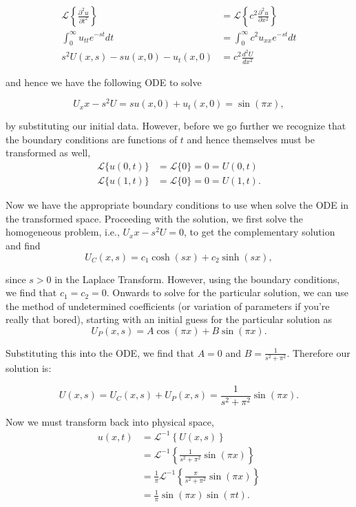 \begin{align*}
\mathscr{L}\left\{ \frac{\partial^2 u}{\partial t^2} \right\} &= \mathscr{L}\left\{ c^2 \frac{\partial^2 u}{\partial x^2} \right\} \\
\int_{0}^\infty u_{tt} e^{-st} dt &= \int_{0}^\infty c^2 u_{xx} e^{-st} dt \\
s^2 U(x,s) - s u(x,0) - u_t(x,0) &= c^2 \frac{ d^2 U}{dx^2} 
\end{align*}

and hence we have the following ODE to solve

$$U_xx - s^2 U = s u(x,0) + u_t(x,0) = \sin(\pi x),$$

by substituting our initial data. However, before we go further we recognize that the boundary conditions are functions of $t$ and hence themselves must be transformed as well,
\begin{align*}
\mathscr{L}\{ u(0,t)  \} &=  \mathscr{L}\{ 0 \} = 0 = U(0,t) \\
\mathscr{L}\{ u(1,t)  \} &=  \mathscr{L}\{ 0 \} = 0 = U(1,t).
\end{align*}

Now we have the appropriate boundary conditions to use when solve the ODE in the transformed space. Proceeding with the solution, we first solve the homogeneous problem, i.e., $U_xx - s^2 U = 0$, to get the complementary solution and find $$U_C(x,s) = c_1 \cosh(sx) + c_2 \sinh(sx),$$

since $s>0$ in the Laplace Transform. However, using the boundary conditions, we find that $c_1 = c_2 = 0.$ Onwards to solve for the particular solution, we can use the method of undetermined coefficients (or variation of parameters if you're really that bored), starting with an initial guess for the particular solution as $$U_P(x,s) = A \cos(\pi x) + B\sin(\pi x).$$

Substituting this into the ODE, we find that $A=0$ and $B=\frac{1}{s^2+\pi^2}.$ Therefore our solution is:

$$U(x,s) = U_C(x,s) + U_P(x,s) = \frac{1}{s^2+\pi^2} \sin(\pi x).$$

Now we must transform back into physical space, 
\begin{align*}
u(x,t) &= \mathscr{L}^{-1}\left\{ U(x,s)  \right\} \\
& =  \mathscr{L}^{-1}\left\{  \frac{1}{s^2+\pi^2} \sin(\pi x) \right\} \\
& = \frac{1}{\pi}  \mathscr{L}^{-1}\left\{  \frac{\pi}{s^2+\pi^2} \sin(\pi x) \right\} \\
&= \frac{1}{\pi} \sin(\pi x) \sin(\pi t).
\end{align*}




